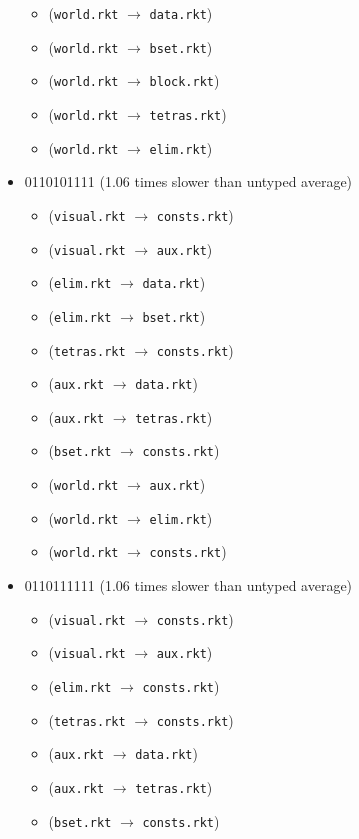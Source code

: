 \documentclass{article}
\newcommand{\mono}[1]{\texttt{#1}}
\begin{document}
\begin{itemize}
\begin{itemize}
  \item (\mono{world.rkt} $\rightarrow$ \mono{data.rkt})
  \item (\mono{world.rkt} $\rightarrow$ \mono{bset.rkt})
  \item (\mono{world.rkt} $\rightarrow$ \mono{block.rkt})
  \item (\mono{world.rkt} $\rightarrow$ \mono{tetras.rkt})
  \item (\mono{world.rkt} $\rightarrow$ \mono{elim.rkt})
  \end{itemize}
\item 0110101111 (1.06 times slower than untyped average)
  \begin{itemize}
  \item (\mono{visual.rkt} $\rightarrow$ \mono{consts.rkt})
  \item (\mono{visual.rkt} $\rightarrow$ \mono{aux.rkt})
  \item (\mono{elim.rkt} $\rightarrow$ \mono{data.rkt})
  \item (\mono{elim.rkt} $\rightarrow$ \mono{bset.rkt})
  \item (\mono{tetras.rkt} $\rightarrow$ \mono{consts.rkt})
  \item (\mono{aux.rkt} $\rightarrow$ \mono{data.rkt})
  \item (\mono{aux.rkt} $\rightarrow$ \mono{tetras.rkt})
  \item (\mono{bset.rkt} $\rightarrow$ \mono{consts.rkt})
  \item (\mono{world.rkt} $\rightarrow$ \mono{aux.rkt})
  \item (\mono{world.rkt} $\rightarrow$ \mono{elim.rkt})
  \item (\mono{world.rkt} $\rightarrow$ \mono{consts.rkt})
  \end{itemize}
\item 0110111111 (1.06 times slower than untyped average)
  \begin{itemize}
  \item (\mono{visual.rkt} $\rightarrow$ \mono{consts.rkt})
  \item (\mono{visual.rkt} $\rightarrow$ \mono{aux.rkt})
  \item (\mono{elim.rkt} $\rightarrow$ \mono{consts.rkt})
  \item (\mono{tetras.rkt} $\rightarrow$ \mono{consts.rkt})
  \item (\mono{aux.rkt} $\rightarrow$ \mono{data.rkt})
  \item (\mono{aux.rkt} $\rightarrow$ \mono{tetras.rkt})
  \item (\mono{bset.rkt} $\rightarrow$ \mono{consts.rkt})

\end{itemize}
\end{itemize}
\end{document}
